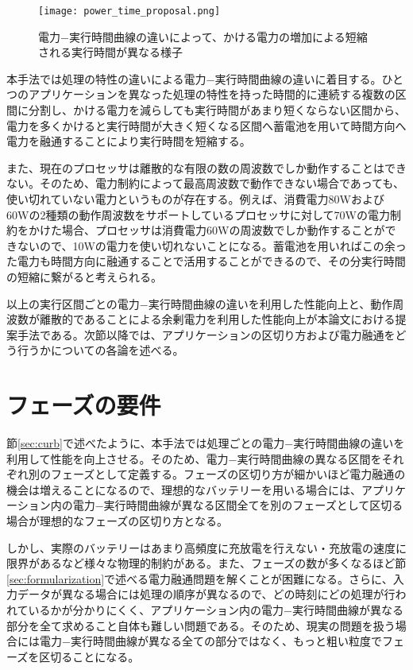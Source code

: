 \begin{figure}[t]
 \begin{center}
  \texttt{[image: power\_time\_proposal.png]}
 \end{center}
 \caption{電力−実行時間曲線の違いによって、かける電力の増加による短縮される実行時間が異なる様子}
 \label{fig:power_time_proposal}
\end{figure}

本手法では処理の特性の違いによる電力−実行時間曲線の違いに着目する。ひとつのアプリケーションを異なった処理の特性を持った時間的に連続する複数の区間に分割し、かける電力を減らしても実行時間があまり短くならない区間から、電力を多くかけると実行時間が大きく短くなる区間へ蓄電池を用いて時間方向へ電力を融通することにより実行時間を短縮する。

また、現在のプロセッサは離散的な有限の数の周波数でしか動作することはできない。そのため、電力制約によって最高周波数で動作できない場合であっても、使い切れていない電力というものが存在する。例えば、消費電力80Wおよび60Wの2種類の動作周波数をサポートしているプロセッサに対して70Wの電力制約をかけた場合、プロセッサは消費電力60Wの周波数でしか動作することができないので、10Wの電力を使い切れないことになる。蓄電池を用いればこの余った電力も時間方向に融通することで活用することができるので、その分実行時間の短縮に繋がると考えられる。

以上の実行区間ごとの電力−実行時間曲線の違いを利用した性能向上と、動作周波数が離散的であることによる余剰電力を利用した性能向上が本論文における提案手法である。次節以降では、アプリケーションの区切り方および電力融通をどう行うかについての各論を述べる。


\section{フェーズの要件}
\label{sec:phase1}

節\ref{sec:curb}で述べたように、本手法では処理ごとの電力−実行時間曲線の違いを利用して性能を向上させる。そのため、電力−実行時間曲線の異なる区間をそれぞれ別のフェーズとして定義する。フェーズの区切り方が細かいほど電力融通の機会は増えることになるので、理想的なバッテリーを用いる場合には、アプリケーション内の電力−実行時間曲線が異なる区間全てを別のフェーズとして区切る場合が理想的なフェーズの区切り方となる。

しかし、実際のバッテリーはあまり高頻度に充放電を行えない・充放電の速度に限界があるなど様々な物理的制約がある。また、フェーズの数が多くなるほど節\ref{sec:formularization}で述べる電力融通問題を解くことが困難になる。さらに、入力データが異なる場合には処理の順序が異なるので、どの時刻にどの処理が行われているかが分かりにくく、アプリケーション内の電力−実行時間曲線が異なる部分を全て求めること自体も難しい問題である。そのため、現実の問題を扱う場合には電力−実行時間曲線が異なる全ての部分ではなく、もっと粗い粒度でフェーズを区切ることになる。

